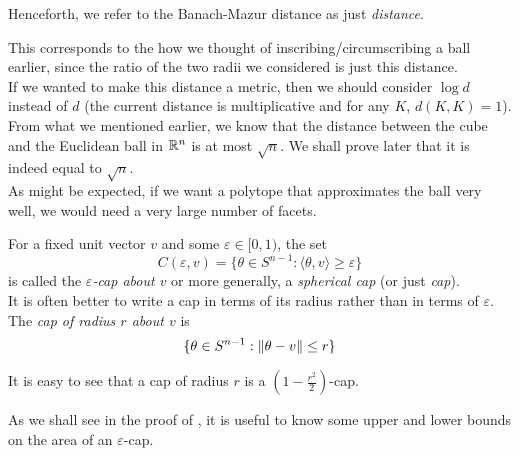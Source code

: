 Henceforth, we refer to the Banach-Mazur distance as just \textit{distance}.

This corresponds to the how we thought of inscribing/circumscribing a ball earlier, since the ratio of the two radii we considered is just this distance.\\
If we wanted to make this distance a metric, then we should consider $\log d$ instead of $d$ (the current distance is multiplicative and for any $K$, $d(K,K)=1$).\\

From what we mentioned earlier, we know that the distance between the cube and the Euclidean ball in $\mathbb{R}^n$ is at most $\sqrt{n}$. We shall prove later that it is indeed equal to $\sqrt n$.\\

As might be expected, if we want a polytope that approximates the ball very well, we would need a very large number of facets.

\begin{definition}
For a fixed unit vector $v$ and some $\varepsilon\in[0,1)$, the set
\[ C(\varepsilon,v) = \{\theta\in S^{n-1}: \langle\theta, v\rangle\geq\varepsilon\} \]
is called the \textit{$\varepsilon$-cap about $v$} or more generally, a \textit{spherical cap} (or just \textit{cap}).\\
It is often better to write a cap in terms of its radius rather than in terms of $\varepsilon$. The \textit{cap of radius $r$ about $v$} is
\[ \{\theta\in S^{n-1} : \left\lVert\theta-v\right\rVert\leq r\} \]
\end{definition}

It is easy to see that a cap of radius $r$ is a $(1-\frac{r^2}{2})$-cap.

As we shall see in the proof of , it is useful to know some upper and lower bounds on the area of an $\varepsilon$-cap.

